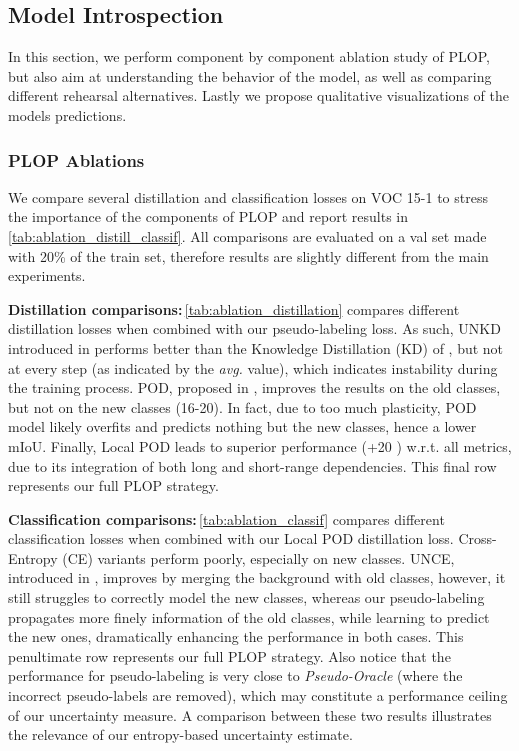 

\subsection{Model Introspection}

In this section, we perform component by component ablation study of PLOP, but also aim at
understanding the behavior of the model, as well as comparing different rehearsal alternatives.
Lastly we propose qualitative visualizations of the models predictions.

\subsubsection{PLOP Ablations}

We compare several distillation and classification losses on VOC 15-1 to stress the importance of
the components of PLOP and report results in \autoref{tab:ablation_distill_classif}. All
comparisons are evaluated on a val set made with 20\% of the train set, therefore results are
slightly different from the main experiments.

\noindent\textbf{Distillation comparisons:\,}\autoref{tab:ablation_distillation} compares different
distillation losses when combined with our pseudo-labeling loss. As such, UNKD introduced in
\citep{cermelli2020modelingthebackground} performs better than the Knowledge Distillation (KD) of
\citep{hinton2015knowledge_distillation}, but not at every step (as indicated by the \textit{avg.}
value), which indicates instability during the training process. POD, proposed in
\citep{douillard2020podnet}, improves the results on the old classes, but not on the new classes
(16-20). In fact, due to too much plasticity, POD model likely overfits and predicts nothing but the
new classes, hence a lower mIoU.  Finally, Local POD leads to superior performance (+20 \pp) w.r.t.
all metrics, due to its integration of both long and short-range dependencies. This final row
represents our full PLOP strategy.


\noindent\textbf{Classification comparisons:\,}\autoref{tab:ablation_classif} compares different
classification losses when combined with our Local POD distillation loss. Cross-Entropy (CE)
variants perform poorly, especially on new classes. UNCE, introduced in
\citep{cermelli2020modelingthebackground}, improves by merging the background with old classes,
however, it still struggles to correctly model the new classes, whereas our pseudo-labeling
propagates more finely information of the old classes, while learning to predict the new ones,
dramatically enhancing the performance in both cases. This penultimate row represents our full PLOP
strategy. Also notice that the performance for pseudo-labeling is very close to
\textit{Pseudo-Oracle} (where the incorrect pseudo-labels are removed), which may constitute a
performance ceiling of our uncertainty measure. A comparison between these two results illustrates
the relevance of our entropy-based uncertainty estimate.

